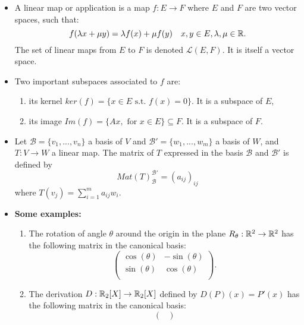 \begin{itemize}
\\
\\

\item A linear map or application is a map $f: E \rightarrow F$ where $E$ and $F$ are two vector spaces, such that:
\[f(\lambda x + \mu y) =  \lambda f(x) + \mu f(y) \quad x,y \in E, \lambda, \mu \in \mathbb R.\]
The set of linear maps from $E$ to $F$ is denoted $\mathcal L(E,F)$. It is itself a vector space.
\item Two important subspaces associated to $f$ are:
\begin{enumerate}
\item its kernel $ker(f) = \{ x\in E \text{ s.t. } f(x)=0\} $. It is a subspace of $E$,
\item its image $Im(f) = \{Ax , \text{ for } x\in E\} \subseteq F$. It is a subspace of $F$.
\end{enumerate} 
\item Let 
$ \mathcal B =\{v_1, ..., v_n\}$ a basis of $V$ and $ \mathcal B' =\{w_1, ..., w_m\}$ a basis of $W$, and $T: V \rightarrow W$ a linear map. The matrix of $T$ expressed in the basis $\mathcal B$ and $\mathcal B'$ is defined by 
\[Mat(T)_{\mathcal B}^{\mathcal B'} = (a_{ij})_{ij}\]
where $T(v_j) = \sum_{i=1}^m a_{ij }w_i$.
\item \textbf{Some examples:}
\begin{enumerate}
\item The rotation of angle $\theta$ around the origin in the plane $R_\theta: \mathbb R^2\rightarrow \mathbb R^2$ has the following matrix in the canonical basis:
\[\begin{pmatrix}  
\cos(\theta) & -\sin(\theta) \\
\sin(\theta) & \cos(\theta) \\
\end{pmatrix}.\]
\item The derivation $D: \mathbb R_2[X]\rightarrow \mathbb R_2[X]$ defined by $D(P)(x) = P'(x)$ has the following matrix in the canonical basis:
\[\begin{pmatrix}  

\end{pmatrix}\]
\end{enumerate}
\end{itemize}
